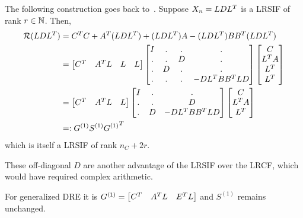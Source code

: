 The following construction goes back to~\cite{Lang2015}.
Suppose $X_n = LDL^T$ is a \ac{LRSIF} of rank $r\in\mathbb{N}$.
Then,
\begin{subequations}
\begin{align}
  \operatorname{\mathcal R}(LDL^T)
  &= C^T C + A^T (LDL^T) + (LDL^T) A - (LDL^T) BB^T (LDL^T) \\
  &= \begin{bmatrix}
    C^T & A^T L & L & L
  \end{bmatrix}
  \begin{bmatrix}
    I & . & . & . \\
    . & . & D & . \\
    . & D & . & . \\
    . & . & . & - DL^T BB^T LD
  \end{bmatrix}
  \begin{bmatrix}
    C \\
    L^T A \\
    L^T \\
    L^T
  \end{bmatrix} \\
  \label{eq:ros:lr-condensed:2}
  &= \begin{bmatrix}
    C^T & A^T L & L
  \end{bmatrix}
  \begin{bmatrix}
    I & . & . \\
    . & . & D \\
    . & D & - DL^T BB^T LD
  \end{bmatrix}
  \begin{bmatrix}
    C \\
    L^T A \\
    L^T
  \end{bmatrix} \\
  &=: G^{(1)} S^{(1)} {G^{(1)}}^T
\end{align}
\end{subequations}
which is itself a \ac{LRSIF} of rank $n_C + 2r$.

\begin{remark}
  These off-diagonal $D$ are another advantage of the \ac{LRSIF} over the \ac{LRCF},
  which would have required complex arithmetic.
\end{remark}

\begin{remark}
  For generalized \ac{DRE} it is $G^{(1)} = \begin{bmatrix}
    C^T & A^T L & E^T L
  \end{bmatrix}$ and $S^{(1)}$ remains unchanged.
\end{remark}

